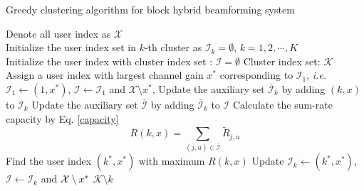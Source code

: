 \documentclass[conference]{IEEEtran}
\def\argmax{\mathop{\mbox{arg\,max}}}
\begin{document}
{%

%

\begin{algorithm}[h] 		
	\caption{Greedy clustering algorithm for block hybrid beamforming system}
	\label{beam_cluster}
	\begin{algorithmic}[1]
		\REQUIRE  \quad
		\STATE	Denote all user index as $\mathcal{X}$ \\
		\STATE  Initialize the user index set in $k$-th cluster as $\mathcal{I}_k=\emptyset$, $k=1,2,\cdots, K$\\
		\STATE 	Initialize the user index with cluster index set : $\bm{\mathcal{I}}=\emptyset$
		\STATE  Cluster index set: $\mathcal{K}$\\
		\ENSURE   	
		\STATE Assign a user index with largest channel gain $x^*$ corresponding to ${\mathcal I}_1$, {\em i.e.} $\mathcal{I}_1 \leftarrow  (1, x^*)$,  $\bm{\mathcal{I}} \leftarrow \mathcal{I}_1$ and ${\mathcal X}\setminus x^*$,
		\STATE  Update the auxiliary set $\bar{{\mathcal{I}}}_k$ by adding $(k,x)$ to $\mathcal{I}_k$
		\STATE  Update the auxiliary set $\bar{\bm{\mathcal{I}}}$ by adding $\bar{\mathcal{I}}_k$ to ${\bm{\mathcal{I}}}$
		\STATE Calculate the sum-rate capacity by Eq. \eqref{capacity} $${R}(k,x)= \sum_{(j,u)\in \bar{\bm{\mathcal{I}}}} \tilde{R}_{j,u}$$
		\ENDFOR
		\STATE Find the user index $(k^*,x^*)$ with maximum $R(k,x)$
		\STATE Update $\mathcal{I}_{k}\leftarrow (k^*, x^*)$, $\bm{\mathcal{I}}\leftarrow \mathcal{I}_k$ and  ${\cal X}\setminus x^*$
		\ENDFOR
		\STATE ${\mathcal{K}} \setminus k$
		\ENDIF
		\ENDWHILE
	\end{algorithmic}
\end{algorithm}

}
\end{document}
